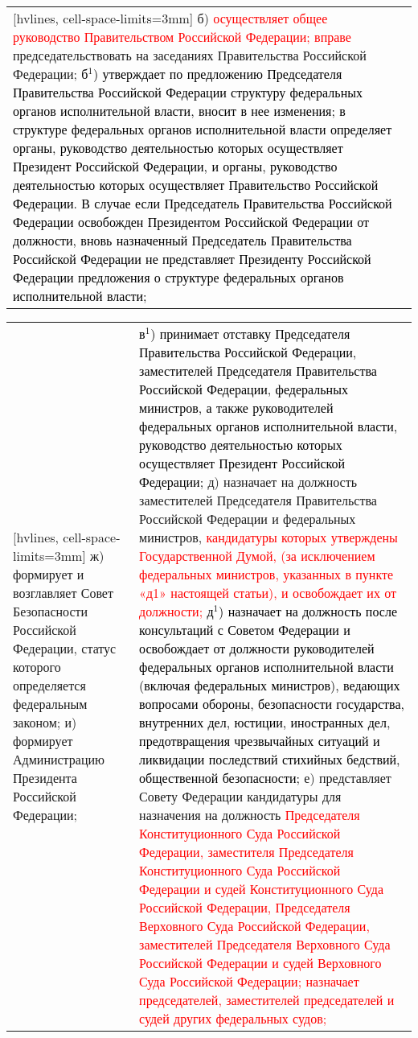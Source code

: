 \documentclass[a4paper,14pt]{extarticle}
\begin{document}
\begin{NiceTabular}{p{92mm}p{91mm}}[hvlines, cell-space-limits=3mm]
		б) \textcolor{red}{осуществляет общее руководство Правительством Российской Федерации; вправе }председательствовать на заседаниях Правительства Российской Федерации; \newline
		\textcolor{black}{
			б$^1$) утверждает по предложению Председателя Правительства Российской Федерации структуру федеральных органов исполнительной власти, вносит в нее изменения; в структуре федеральных органов исполнительной власти определяет органы, руководство деятельностью которых осуществляет Президент Российской Федерации, и органы, руководство деятельностью которых осуществляет Правительство Российской Федерации. В случае если Председатель Правительства Российской Федерации освобожден Президентом Российской Федерации от должности, вновь назначенный Председатель Правительства Российской Федерации не представляет Президенту Российской Федерации предложения о структуре федеральных органов исполнительной власти;
		}
	\end{NiceTabular}
	
	\pagebreak
	\noindent
	\begin{NiceTabular}{p{92mm}p{91mm}}[hvlines, cell-space-limits=3mm]
	ж) формирует и возглавляет Совет Безопасности Российской Федерации, статус которого определяется федеральным законом;
	и) формирует Администрацию Президента Российской Федерации;
	& \textcolor{black}{
		в$^1$) принимает отставку Председателя Правительства Российской Федерации, заместителей Председателя Правительства Российской Федерации, федеральных министров, а также руководителей федеральных органов исполнительной власти, руководство деятельностью которых осуществляет Президент Российской Федерации;
	} \newline
	д) назначает на должность заместителей Председателя Правительства Российской Федерации и федеральных министров, \textcolor{red}{кандидатуры которых утверждены Государственной Думой, (за исключением федеральных министров, указанных в пункте «д1» настоящей статьи), и освобождает их от должности;} \newline
	\textcolor{black}{
		д$^1$) назначает на должность после консультаций с Советом Федерации и освобождает от должности руководителей федеральных органов исполнительной власти (включая федеральных министров), ведающих вопросами обороны, безопасности государства, внутренних дел, юстиции, иностранных дел, предотвращения чрезвычайных ситуаций и ликвидации последствий стихийных бедствий, общественной безопасности;
	} \newline
	е) представляет Совету Федерации кандидатуры для назначения на должность \textcolor{red}{Председателя Конституционного Суда Российской Федерации, заместителя	Председателя Конституционного Суда Российской Федерации и судей Конституционного Суда Российской Федерации, Председателя Верховного Суда Российской Федерации, заместителей Председателя Верховного Суда Российской Федерации и судей Верховного Суда Российской Федерации; назначает председателей, заместителей председателей и судей других федеральных судов;}
	\end{NiceTabular}
	
\end{document}
